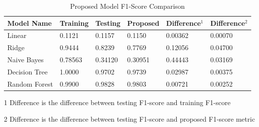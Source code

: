 \documentclass[a4paper,conference]{IEEEtran}
\begin{document}
\begin{table}[t!]
\renewcommand{\arraystretch}{1.3} 
\caption{Proposed Model F1-Score Comparison}
\centering
\begin{threeparttable}
\begin{tabular}{llllll} %
\bf Model Name & \bf Training & \bf Testing & \bf Proposed & \bf Difference$^1$ & \bf Difference$^2$  \\ \hline 
Linear & 0.1121 & 0.1157 & 0.1150 & 0.00362 & 0.00070\\ 
Ridge  & 0.9444  & 0.8239 & 0.7769 & 0.12056 & 0.04700\\
Naive Bayes  & 0.78563  & 0.34120 & 0.30951 & 0.44443 & 0.03169\\
Decision Tree & 1.0000 & 0.9702 & 0.9739 & 0.02987 & 0.00375\\ 
Random Forest & 0.9900 & 0.9828 & 0.9803 & 0.00721 & 0.00252\\ 
\end{tabular}
\begin{tablenotes}
\item[1]Difference is the difference between testing F1-score and training F1-score
\item[2]Difference is the difference between testing F1-score and proposed F1-score metric
\end{tablenotes}
\end{threeparttable}
\end{table}
%
%
\end{document}
